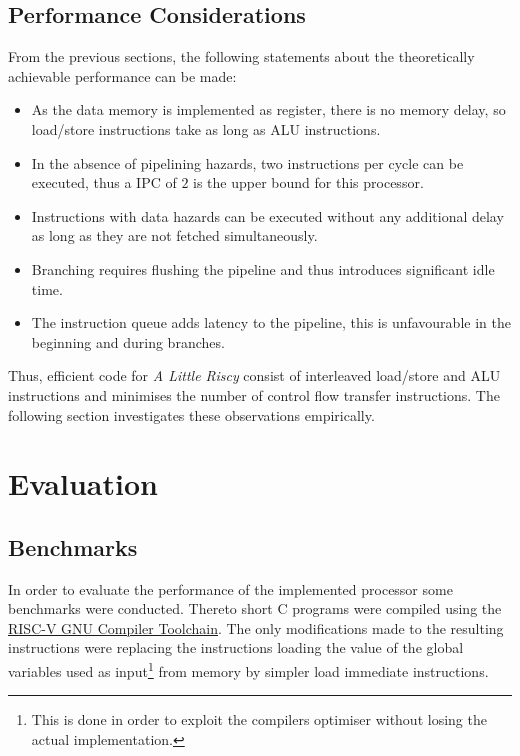 \documentclass[conference]{IEEEtran}
\begin{document}
\subsection{Performance Considerations} \label{sec:performance}
From the previous sections, the following statements about the theoretically achievable performance can be made:
\begin{itemize}
	\item As the data memory is implemented as register, there is no memory delay, so load/store instructions take as long as ALU instructions.
	\item In the absence of pipelining hazards, two instructions per cycle can be executed, thus a IPC of $2$ is the upper bound for this processor.
	\item Instructions with data hazards can be executed without any additional delay as long as they are not fetched simultaneously.
	\item Branching requires flushing the pipeline and thus introduces significant idle time.
	\item The instruction queue adds latency to the pipeline, this is unfavourable in the beginning and during branches.
\end{itemize}

Thus, efficient code for \emph{A Little Riscy} consist of interleaved load/store and ALU instructions and minimises the number of control flow transfer instructions. The following section investigates these observations empirically.

\section{Evaluation} \label{sec:eval}

\subsection{Benchmarks}

In order to evaluate the performance of the implemented processor some benchmarks were conducted. Thereto short C programs were compiled using the \href{https://github.com/riscv/riscv-gnu-toolchain}{RISC-V GNU Compiler Toolchain}. The only modifications made to the resulting instructions were replacing the instructions loading the value of the global variables used as input\footnote{This is done in order to exploit the compilers optimiser without losing the actual implementation.} from memory by simpler load immediate instructions.
 
\end{document}
